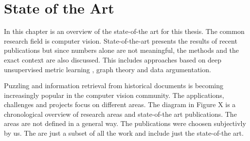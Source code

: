 \chapter{State of the Art}

In this chapter is an overview of the state-of-the art for this thesis. The common research field is computer vision. State-of-the-art presents the results of recent publications but since numbers alone are not meaningful, the methods and the exact context are also discussed. This includes approaches based on deep unsupervised metric learning , graph theory and data argumentation. 

Puzzling and information retrieval from historical documents is becoming increasingly popular in the computer vision community. The applications, challenges and projects focus on different areas. The diagram in Figure X is a chronological overview of research areas and state-of-the art publications. The areas are not defined in a general way. The publications were choosen subjectivly by us. The are just a subset of all the work and include just the state-of-the art.



